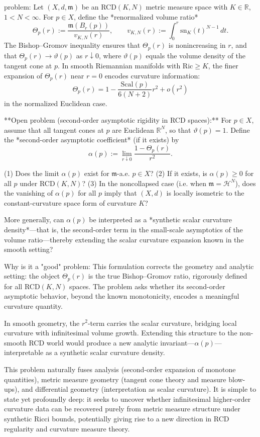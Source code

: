 problem:  
Let \((X,d,\mathfrak{m})\) be an RCD\((K,N)\) metric measure space with \(K\in\mathbb{R}\), \(1<N<\infty\).  
For \(p\in X\), define the *renormalized volume ratio*  
\[
\Theta_p(r) := \frac{\mathfrak{m}(B_r(p))}{v_{K,N}(r)},
\qquad
v_{K,N}(r) := \int_0^r \mathrm{sn}_K(t)^{N-1}\,dt .
\]
The Bishop–Gromov inequality ensures that \(\Theta_p(r)\) is nonincreasing in \(r\), and that \(\Theta_p(r)\to \vartheta(p)\) as \(r\downarrow 0\), where \(\vartheta(p)\) equals the volume density of the tangent cone at \(p\).  
In smooth Riemannian manifolds with \(\mathrm{Ric}\ge K\), the finer expansion of \(\Theta_p(r)\) near \(r=0\) encodes curvature information:
\[
\Theta_p(r) = 1 - \frac{\mathrm{Scal}(p)}{6(N+2)} r^2 + o(r^2)
\]
in the normalized Euclidean case.

**Open problem (second-order asymptotic rigidity in RCD spaces):**  
For \(p\in X\), assume that all tangent cones at \(p\) are Euclidean \(\mathbb{R}^N\), so that \(\vartheta(p)=1\).  
Define the *second-order asymptotic coefficient* (if it exists) by  
\[
\alpha(p):=\lim_{r\downarrow0}\frac{1-\Theta_p(r)}{r^2}.
\]

(1) Does the limit \(\alpha(p)\) exist for \(\mathfrak{m}\)-a.e. \(p\in X\)?  
(2) If it exists, is \(\alpha(p)\ge 0\) for all \(p\) under RCD\((K,N)\)?  
(3) In the noncollapsed case (i.e. when \(\mathfrak{m}=\mathcal{H}^N\)), does the vanishing of \(\alpha(p)\) for all \(p\) imply that \((X,d)\) is locally isometric to the constant-curvature space form of curvature \(K\)?

More generally, can \(\alpha(p)\) be interpreted as a *synthetic scalar curvature density*—that is, the second-order term in the small-scale asymptotics of the volume ratio—thereby extending the scalar curvature expansion known in the smooth setting?

Why is it a "good" problem:  
This formulation corrects the geometry and analytic setting: the object \(\Theta_p(r)\) is the true Bishop–Gromov ratio, rigorously defined for all RCD\((K,N)\) spaces. The problem asks whether its second-order asymptotic behavior, beyond the known monotonicity, encodes a meaningful curvature quantity.  

In smooth geometry, the \(r^2\)-term carries the scalar curvature, bridging local curvature with infinitesimal volume growth. Extending this structure to the non-smooth RCD world would produce a new analytic invariant—\(\alpha(p)\)—interpretable as a synthetic scalar curvature density.  

This problem naturally fuses analysis (second-order expansion of monotone quantities), metric measure geometry (tangent cone theory and measure blow-ups), and differential geometry (interpretation as scalar curvature). It is simple to state yet profoundly deep: it seeks to uncover whether infinitesimal higher-order curvature data can be recovered purely from metric measure structure under synthetic Ricci bounds, potentially giving rise to a new direction in RCD regularity and curvature measure theory.